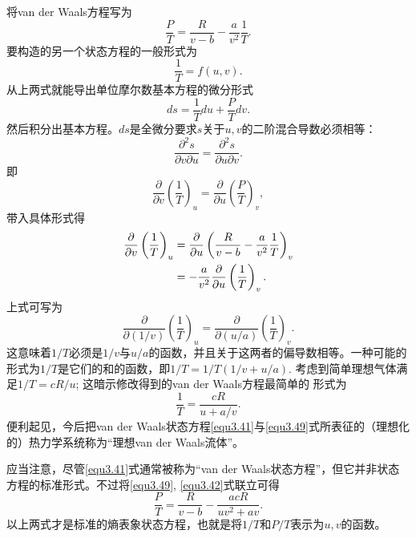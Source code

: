将van der Waals方程写为
\begin{equation}
	\frac{P}{T} = \frac{R}{v - b} - \frac{a}{v^2} \frac{1}{T}.
\label{equ3.42}
\end{equation}
要构造的另一个状态方程的一般形式为
\begin{equation}
	\frac{1}{T} = f(u, v).
\label{equ3.43}
\end{equation}
从上两式就能导出单位摩尔数基本方程的微分形式
\begin{equation}
	ds = \frac{1}{T} du + \frac{P}{T} dv.
\label{equ3.44}
\end{equation}
然后积分出基本方程。$ds$是全微分要求$s$关于$u, v$的二阶混合导数必须相等：
\begin{equation}
	\frac{\partial^2 s}{\partial v \partial u} = \frac{\partial^2 s}{\partial u \partial v}.
\label{equ3.45}
\end{equation}
即
\begin{equation}
    \frac{\partial}{\partial v} \left( \frac{1}{T} \right)_u = \frac{\partial}{\partial u} \left( \frac{P}{T} \right)_v,
\label{equ3.46}
\end{equation}
带入具体形式得
\begin{align}
    \frac{\partial}{\partial v} \left( \frac{1}{T} \right)_u &= \frac{\partial}{\partial u} \left( \frac{R}{v - b} - \frac{a}{v^2} \frac{1}{T} \right)_v \notag \\
    &= -\frac{a}{v^2} \frac{\partial}{\partial u} \left( \frac{1}{T} \right)_v.
\label{equ3.47}
\end{align}
上式可写为
\begin{equation}
    \frac{\partial}{\partial (1/v)} \left( \frac{1}{T} \right)_u = \frac{\partial}{\partial(u/a)} \left( \frac{1}{T} \right)_v.
\label{equ3.48}
\end{equation}
这意味着$1/T$必须是$1/v$与$u/a$的函数，并且关于这两者的偏导数相等。一种可能的形式为$1/T$是它们的和的函数，即$1/T = 1/T(1/v + u/a)$. 考虑到简单理想气体满足$1/T = cR/u$; 这暗示修改得到的van der Waals方程最简单的 形式为
\begin{equation}
    \frac{1}{T} = \frac{cR}{u + a/v}.
\label{equ3.49}
\end{equation}
便利起见，今后把van der Waals状态方程\eqref{equ3.41}与\eqref{equ3.49}式所表征的（理想化的）热力学系统称为“理想van der Waals流体”。

应当注意，尽管\eqref{equ3.41}式通常被称为“van der Waals状态方程”，但它并非状态方程的标准形式。不过将\eqref{equ3.49}, \eqref{equ3.42}式联立可得
\begin{equation}
    \frac{P}{T} = \frac{R}{v - b} - \frac{acR}{uv^2 + av}.
\label{equ3.50}
\end{equation}
以上两式才是标准的熵表象状态方程，也就是将$1/T$和$P/T$表示为$u, v$的函数。

